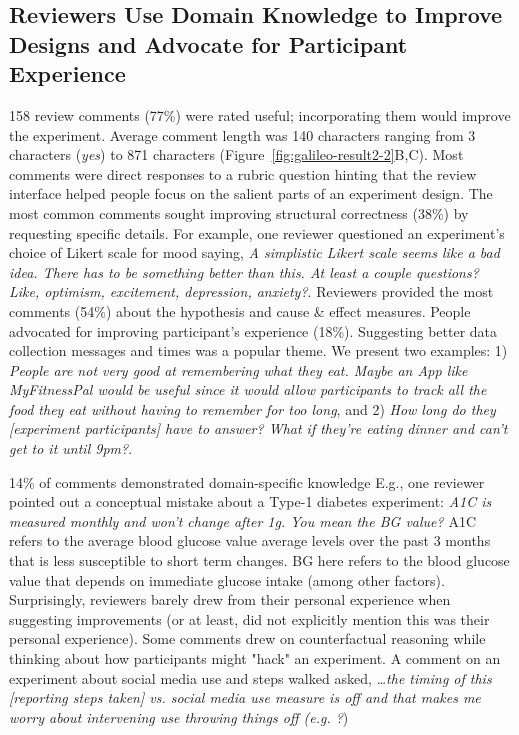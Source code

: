 \subsection{Reviewers Use Domain Knowledge to Improve Designs and Advocate for Participant Experience}
158 review comments (77\%) were rated useful; incorporating them would improve the experiment. Average comment length was 140 characters ranging from 3 characters (\textit{yes}) to 871 characters (Figure~\ref{fig:galileo-result2-2}B,C). Most comments were direct responses to a rubric question hinting that the review interface helped people focus on the salient parts of an experiment design.
The most common comments sought improving structural correctness (38\%) by requesting specific details. For example, one reviewer questioned an experiment's choice of Likert scale for mood saying, \textit{A simplistic Likert scale seems like a bad idea. There has to be something better than this. At least a couple questions? Like, optimism, excitement, depression, anxiety?}. Reviewers provided the most comments (54\%) about the hypothesis and cause \& effect measures. People advocated for improving participant's experience (18\%). Suggesting better data collection messages and times was a popular theme. We present two examples: 1) \textit{People are not very good at remembering what they eat. Maybe an App like MyFitnessPal would be useful since it would allow participants to track all the food they eat without having to remember for too long}, and 2) \textit{How long do they [experiment participants] have to answer? What if they're eating dinner and can't get to it until 9pm?}.

14\% of comments demonstrated domain-specific knowledge E.g., one reviewer pointed out a conceptual mistake about a Type-1 diabetes experiment: \textit{A1C is measured monthly and won't change after 1g. You mean the BG value?} A1C refers to the average blood glucose value average levels over the past 3 months that is less susceptible to short term changes. BG here refers to the blood glucose value that depends on immediate glucose intake (among other factors). Surprisingly, reviewers barely drew from their personal experience when suggesting improvements (or at least, did not explicitly mention this was their personal experience). Some comments drew on counterfactual reasoning while thinking about how participants might "hack" an experiment. A comment on an experiment about social media use and steps walked asked, \textit{…the timing of this [reporting steps taken] vs. social media use measure is off and that makes me worry about intervening use throwing things off (e.g. \textit{?}})

